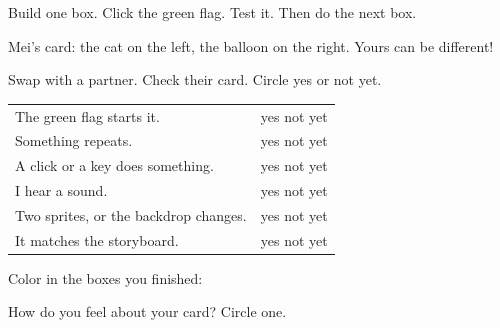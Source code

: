 \begin{exercise}
Build one box. Click the green flag. Test it. Then do the next box.
\begin{center}
\begin{scratch}[scale=0.8]
\end{scratch}
\quad
\begin{scratch}[scale=0.8]
\end{scratch}
\end{center}
Mei's card: the cat on the left, the balloon on the right. Yours can be different!
\end{exercise}

\begin{exercise}
Swap with a partner. Check their card. Circle yes or not yet.
\begin{center}
\begin{tabular}{@{}l c@{}}
The green flag starts it. & yes \quad not yet\\
Something repeats. & yes \quad not yet\\
A click or a key does something. & yes \quad not yet\\
I hear a sound. & yes \quad not yet\\
Two sprites, or the backdrop changes. & yes \quad not yet\\
It matches the storyboard. & yes \quad not yet\\
\end{tabular}
\end{center}
\end{exercise}

\begin{vocab}
\end{vocab}

\begin{reflection}
Color in the boxes you finished: \quad {}  

How do you feel about your card? Circle one.

\begin{center}
\Huge\faSmile[regular]\qquad\faMeh[regular]\qquad\faFrown[regular]
\end{center}
\end{reflection}

